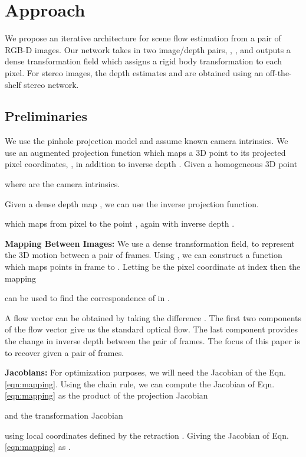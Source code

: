 \documentclass[final]{cvpr}
\begin{document}
\section{Approach}

We propose an iterative architecture for scene flow estimation from a pair of RGB-D images. Our network takes in two image/depth pairs, , , and outputs a dense transformation field  which assigns a rigid body transformation to each pixel. For stereo images, the depth estimates  and  are obtained using an off-the-shelf stereo network.

\subsection{Preliminaries}
We use the pinhole projection model and assume known camera intrinsics. We use an augmented projection function which maps a 3D point to its projected pixel coordinates, , in addition to inverse depth . Given a homogeneous 3D point 

where  are the camera intrinsics.

Given a dense depth map , we can use the inverse projection function.

which maps from pixel  to the point , again with inverse depth .

\vspace{1mm} \noindent \textbf{Mapping Between Images:} We use a dense transformation field,  to represent the 3D motion between a pair of frames. Using , we can construct a function which maps points in frame  to . Letting  be the pixel coordinate at index  then the mapping

can be used to find the correspondence of  in .

A flow vector can be obtained by taking the difference . The first two components of the flow vector give us the standard optical flow. The last component provides the change in inverse depth between the pair of frames. The focus of this paper is to recover  given a pair of frames.

\vspace{1mm} \noindent \textbf{Jacobians:} For optimization purposes, we will need the Jacobian of the Eqn. \ref{eqn:mapping}. Using the chain rule, we can compute the Jacobian of Eqn. \ref{eqn:mapping} as the product of the projection Jacobian

and the transformation Jacobian

using local coordinates defined by the retraction . Giving the Jacobian of Eqn. \ref{eqn:mapping} as .
\end{document}
